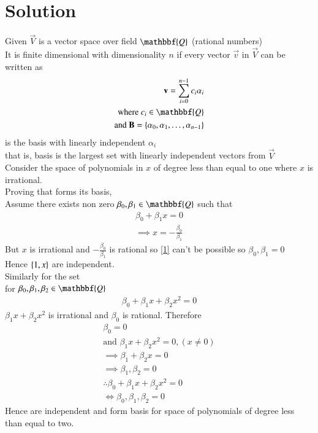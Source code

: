 \documentclass[journal,12pt,twocolumn]{IEEEtran}
\begin{document}
\section{Solution}
Given $\vec{V}$ is a vector space over field $\mathbbf{Q}$ (rational numbers)\\
It is finite dimensional with dimensionality $n$ if every vector $\vec{v}$ in $\vec{V}$ can be written as
\begin{align}
    \vec{v}=\sum_{i=0}^{n-1} c_i\alpha_i\\
    \text{where }c_i \in \mathbbf{Q}\\
    \text{and } \vec{B}= \cbrak{\alpha_0,\alpha_1,\hdots,\alpha_{n-1} }
\end{align}
is the basis with linearly independent $\alpha_i$\\
that is, basis is the largest set with linearly independent vectors from $\vec{V}$\\
Consider the space of polynomials in $x$ of degree less than equal to one where $x$ is irrational.\\
Proving that  forms its basis,\\
Assume there exists non zero $\beta_0,\beta_1 \in \mathbbf{Q}$ such that
\begin{align}
   \beta_0+\beta_1x=0 \\
   \implies x=-\frac{\beta_0}{\beta_1}\label{1}
\end{align}
But $x$ is irrational and $-\frac{\beta_0}{\beta_1}$ is rational so \eqref{1} can't be possible so $\beta_0,\beta_1=0$\\
Hence $\left\{1,x\right\}$ are independent.\\
Similarly for the set  \\
for  $\beta_0,\beta_1,\beta_2 \in \mathbbf{Q}$
\begin{align}
  \beta_0+\beta_1x+\beta_2x^2=0  
\end{align}
$\beta_1x+\beta_2x^2$ is irrational and $\beta_0$ is rational. Therefore
\begin{align}
  \beta_0=0\label{2}\\
  \text{and  } \beta_1x+\beta_2x^2=0,( x \neq 0)\label{3}\\
  \implies \beta_1+\beta_2x=0  \\
  \implies \beta_1,\beta_2=0\\
  \therefore  \beta_0+\beta_1x+\beta_2x^2=0\\ \iff \beta_0,\beta_1,\beta_2=0
\end{align}
Hence  are independent and form basis for space of polynomials of degree less than equal to two.\\
\end{document}
